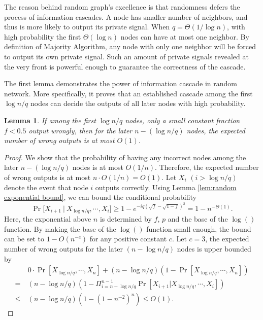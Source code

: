\documentclass[a4paper,UKenglish]{lipics}
\newtheorem{lem}[thm]{Lemma}
\theoremstyle{definition}
\begin{document}
The reason behind random graph's excellence is that randomness defers the process of information cascades.
A node has smaller number of neighbors, and thus is more likely to output its private signal.
When $q = \Theta(1/ \log n)$, with high probability the first $\Theta(\log n)$ nodes can have at most one neighbor.
By definition of Majority Algorithm, any node with only one neighbor will be forced to output its own private signal.
Such an amount of private signals revealed at the very front is powerful enough to guarantee the correctness of the cascade.

The first lemma demonstrates the power of information cascade in random network.
More specifically, it proves that an established cascade among the first $\log n / q$ nodes can decide the outputs of all later nodes with high probability.

\begin{lem} \label {lem:first logn/q deciding}
If among the first $\log n/q$ nodes, 
	only a small constant fraction $f < 0.5$ output wrongly, 
	then for the later $n - (\log n/q)$ nodes, the expected number of wrong outputs is at most $O(1)$.
\end{lem}

\begin{proof}
We show that the probability of having any incorrect nodes among the later $n - (\log n/q)$ nodes is at most $O(1/n)$.
Therefore, the expected number of wrong outputs is at most $n\cdot O(1/n) = O(1)$. 
Let $X_i$ $(i > \log n/q)$ denote the event that node $i$ outputs correctly.
Using Lemma \ref{lem:random exponential bound}, we can bound the conditional probability
\begin{equation*}
	\Pr\Big[
		X_{i+1}~\Big|~ X_{\log n/q}, \dotsb, X_{i}
	\Big]
\ge
	1 - e^{-iq(\sqrt{f} - \sqrt{1-f})^2}
=
	1 - n^{-\Theta(1)}.
\end{equation*}
Here, the exponential above $n$ is determined by $f$, $p$ and the base of the $\log()$ function. 
By making the base of the $\log()$ function small enough, the bound can be set to $1 - O(n^{-c})$ for any positive constant $c$.
Let $c = 3$, the expected number of wrong outputs for the later $(n - \log n/q)$ nodes is upper bounded by
\begin{align*}
&
	0\cdot \Pr[X_{\log n/q}, \dotsb, X_n] + (n - \log n/q)(1 - \Pr[X_{\log n/q}, \dotsb, X_n]) \\
=~ & 
	(n - \log n/q)(1 - \Pi_{i = n - \log n/q}^{n-1}\Pr[X_{i+1} | X_{\log n/q}, \dotsb, X_i]) \\
\le~ &
	(n - \log n/q)(1 - (1 - n^{-2})^n)
	\le
	O(1).
\end{align*}
\end{proof}
\end{document}
